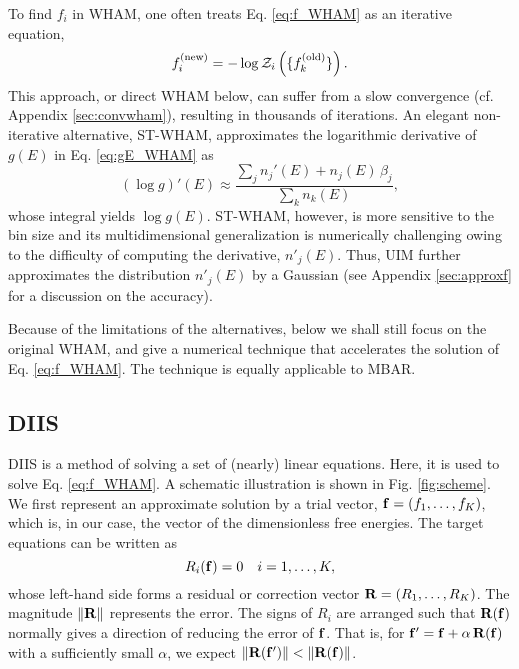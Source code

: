 \documentclass[reprint,aip,jcp,superscriptaddress]{revtex4-1}
\begin{document}
To find $f_i$ in WHAM,
one often treats Eq. \eqref{eq:f_WHAM}
as an iterative equation,
%
\begin{equation*}
f_i^\mathrm{(new)}
=
-\log \mathcal{Z}_i\left(
  \{ f_k^\mathrm{(old)} \}
\right).
\end{equation*}
%
This approach, or direct WHAM below,
can suffer from a slow convergence
(cf. Appendix \ref{sec:convwham}),
resulting in thousands of iterations\cite{
bereau2009, kim2011}.
%
An elegant non-iterative alternative, ST-WHAM,
approximates the logarithmic derivative of $g(E)$
in Eq. \eqref{eq:gE_WHAM} as\cite{
kim2011}
%
\begin{equation}
(\log g)'(E)
\approx
\frac{
  \sum_j n_j'(E) + n_j(E) \, \beta_j
}
{
  \sum_k n_k(E)
},
\label{eq:beta_STWHAM}
\end{equation}
%
whose integral yields $\log g(E)$.
%
ST-WHAM, however,
is more sensitive to the bin size
and its multidimensional generalization
is numerically challenging
owing to the difficulty of
computing the derivative,
$n'_j(E)$\cite{
kim2011}.
%
Thus, UIM\cite{
kastner2005}
further approximates
the distribution $n'_j(E)$ by a Gaussian
(see Appendix \ref{sec:approxf}
for a discussion on the accuracy).



Because of the limitations of the alternatives,
below we shall still focus on the original WHAM,
and give a numerical technique
that accelerates the solution
of Eq. \eqref{eq:f_WHAM}.
%
The technique is equally applicable to MBAR.





\subsection{DIIS}



DIIS is a method of solving a set of
(nearly) linear equations\cite{
pulay1980, *pulay1982, *hamilton1986,
kovalenko1999, howard2011}.
%
Here, it is used
to solve Eq. \eqref{eq:f_WHAM}.
%
A schematic illustration
is shown in Fig. \ref{fig:scheme}.
%
We first represent an approximate solution
by a trial vector,
$\mathbf{f} = (f_1, \dots, f_K)$,
which is, in our case, the vector of
the dimensionless free energies.
%
The target equations can be written as
%
\begin{equation}
  R_i(\mathbf{f}) = 0  \quad i = 1, \ldots, K,
  \label{eq:R_f}
\end{equation}
%
whose left-hand side forms
a residual or correction vector
$\mathbf{R} = (R_1, \dots, R_K)$.
%
The magnitude
$\| \mathbf{R} \|$
represents the error.
%
The signs of $R_i$ are arranged such that
$\mathbf{R}(\mathbf{f})$
normally gives a direction
of reducing the error of $\mathbf{f}$.
%
That is,
for $\mathbf{f}' = \mathbf{f} + \alpha \, \mathbf{R}(\mathbf{f})$
with a sufficiently small $\alpha$,
we expect
%
$\| \mathbf{R}(\mathbf{f}') \| < \| \mathbf{R}(\mathbf{f}) \|$.
\end{document}
